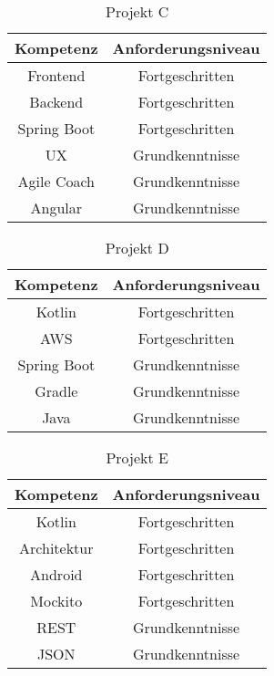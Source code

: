 \begin{table}[h]
	\centering
	\begin{tabular}[h]{c|c}
		Kompetenz   & Anforderungsniveau\\
		\hline
		Frontend    & Fortgeschritten\\
		Backend     & Fortgeschritten\\
		Spring Boot & Fortgeschritten\\
		UX          & Grundkenntnisse\\
		Agile Coach & Grundkenntnisse\\
		Angular     & Grundkenntnisse\\
	\end{tabular}
	\caption{Projekt C}
	\label{tbl:appendix:projektpositionen:projektpositionen:tbl1:projektC}
\end{table}

\begin{table}[h]
	\centering
	\begin{tabular}[h]{c|c}
		Kompetenz   & Anforderungsniveau\\
		\hline
		Kotlin      & Fortgeschritten\\
		AWS         & Fortgeschritten\\
		Spring Boot & Grundkenntnisse\\
		Gradle      & Grundkenntnisse\\
		Java        & Grundkenntnisse\\
	\end{tabular}
	\caption{Projekt D}
	\label{tbl:appendix:projektpositionen:projektpositionen:tbl1:projektD}
\end{table}

\begin{table}[h]
	\centering
	\begin{tabular}[h]{c|c}
		Kompetenz   & Anforderungsniveau\\
		\hline
		Kotlin      & Fortgeschritten\\
		Architektur & Fortgeschritten\\
		Android     & Fortgeschritten\\
		Mockito     & Fortgeschritten\\
		REST        & Grundkenntnisse\\
		JSON        & Grundkenntnisse\\
	\end{tabular}
	\caption{Projekt E}
	\label{tbl:appendix:projektpositionen:projektpositionen:tbl1:projektE}
\end{table}
